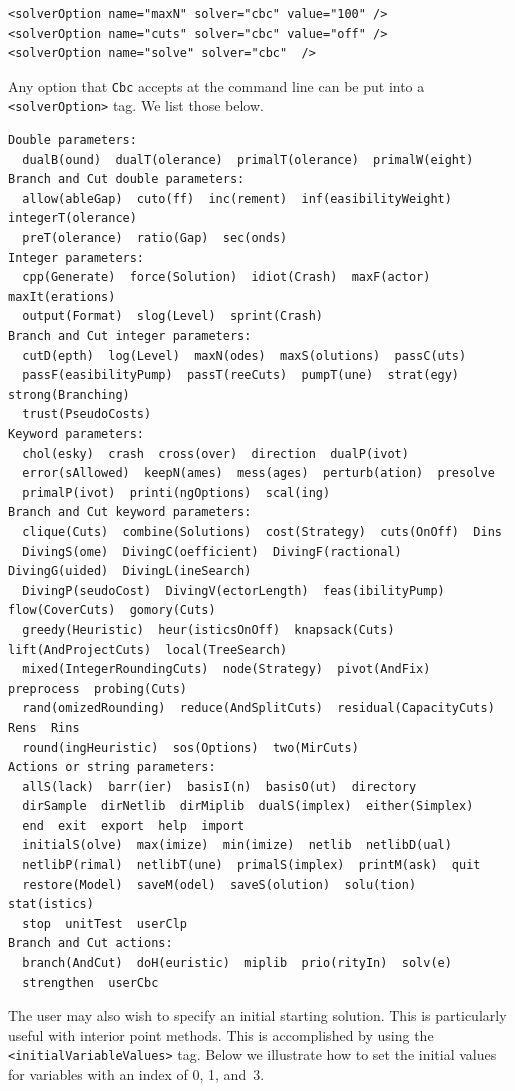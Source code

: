 \documentclass[11pt]{article}
\renewcommand{\_}{{\char"5F}}
\renewcommand{\{}{{\char"7B}}
\renewcommand{\}}{{\char"7D}}
\renewcommand{\^}{{\char"0D}}
\renewcommand{\'}{{\char"0D}}
\begin{document}
\begin{enumerate}[Step 1:]
\begin{verbatim}
<solverOption name="maxN" solver="cbc" value="100" />
<solverOption name="cuts" solver="cbc" value="off" />
<solverOption name="solve" solver="cbc"  />
\end{verbatim}

Any option that {\tt Cbc} accepts at the command line can be put into a {\tt <solverOption>} tag. We list  those below.

{\small
\begin{verbatim}
Double parameters:
  dualB(ound)  dualT(olerance)  primalT(olerance)  primalW(eight)  
Branch and Cut double parameters:
  allow(ableGap)  cuto(ff)  inc(rement)  inf(easibilityWeight)  integerT(olerance)  
  preT(olerance)  ratio(Gap)  sec(onds)  
Integer parameters:
  cpp(Generate)  force(Solution)  idiot(Crash)  maxF(actor)  maxIt(erations)  
  output(Format)  slog(Level)  sprint(Crash)  
Branch and Cut integer parameters:
  cutD(epth)  log(Level)  maxN(odes)  maxS(olutions)  passC(uts)  
  passF(easibilityPump)  passT(reeCuts)  pumpT(une)  strat(egy)  strong(Branching)  
  trust(PseudoCosts)  
Keyword parameters:
  chol(esky)  crash  cross(over)  direction  dualP(ivot)  
  error(sAllowed)  keepN(ames)  mess(ages)  perturb(ation)  presolve  
  primalP(ivot)  printi(ngOptions)  scal(ing)  
Branch and Cut keyword parameters:
  clique(Cuts)  combine(Solutions)  cost(Strategy)  cuts(OnOff)  Dins  
  DivingS(ome)  DivingC(oefficient)  DivingF(ractional)  DivingG(uided)  DivingL(ineSearch)  
  DivingP(seudoCost)  DivingV(ectorLength)  feas(ibilityPump)  flow(CoverCuts)  gomory(Cuts)  
  greedy(Heuristic)  heur(isticsOnOff)  knapsack(Cuts)  lift(AndProjectCuts)  local(TreeSearch)  
  mixed(IntegerRoundingCuts)  node(Strategy)  pivot(AndFix)  preprocess  probing(Cuts)  
  rand(omizedRounding)  reduce(AndSplitCuts)  residual(CapacityCuts)  Rens  Rins  
  round(ingHeuristic)  sos(Options)  two(MirCuts)  
Actions or string parameters:
  allS(lack)  barr(ier)  basisI(n)  basisO(ut)  directory  
  dirSample  dirNetlib  dirMiplib  dualS(implex)  either(Simplex)  
  end  exit  export  help  import  
  initialS(olve)  max(imize)  min(imize)  netlib  netlibD(ual)  
  netlibP(rimal)  netlibT(une)  primalS(implex)  printM(ask)  quit  
  restore(Model)  saveM(odel)  saveS(olution)  solu(tion)  stat(istics)  
  stop  unitTest  userClp  
Branch and Cut actions:
  branch(AndCut)  doH(euristic)  miplib  prio(rityIn)  solv(e)  
  strengthen  userCbc  
\end{verbatim}
}


The user may also wish to specify an initial starting solution. This is particularly
useful with interior point methods.  This is accomplished by using the
{\tt <initialVariableValues>} tag.  Below we illustrate how to set the
initial values for variables with an index of 0, 1, and~3.


\end{enumerate}
\end{document}
